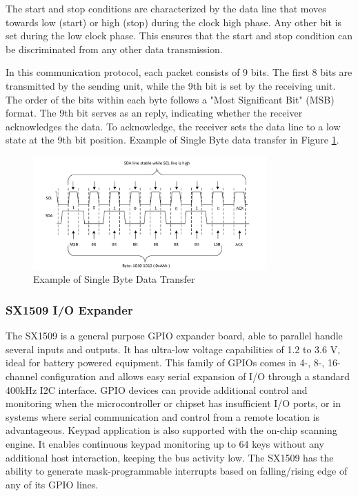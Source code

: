\documentclass[english]{article}
\begin{document}
The start and stop conditions are characterized by the data line that
moves towards low (start) or high (stop) during the clock high phase.
Any other bit is set during the low clock phase. This ensures that the
start and stop condition can be discriminated from any other data
transmission.\newline

In this communication protocol, each packet consists of 9 bits. 
The first 8 bits are transmitted by the sending unit, while the 9th bit is set by the receiving unit. 
The order of the bits within each byte follows a "Most Significant Bit" (MSB) format. 
The 9th bit serves as an reply, indicating whether the receiver acknowledges the data. 
To acknowledge, the receiver sets the data line to a low state at the 9th bit position.
Example of Single Byte data transfer in Figure \ref{fig:Data}.
\begin{figure}[!h]
	\centering
	\includegraphics[width=0.80\textwidth,]{figures/Single_byte.png}
	\caption{Example of Single Byte Data Transfer}
	\label{fig:Data}
\end{figure}

\subsubsection{SX1509 I/O Expander}
The SX1509 is a general purpose GPIO expander board, able to parallel handle several inputs and outputs. It has ultra-low voltage capabilities of 1.2 to 3.6 V, ideal for battery powered equipment. This family of
GPIOs comes in 4-, 8-, 16-channel configuration and
allows easy serial expansion of I/O through a
standard 400kHz I2C interface. GPIO devices can
provide additional control and monitoring when the
microcontroller or chipset has insufficient I/O ports, or
in systems where serial communication and control
from a remote location is advantageous. Keypad application is also supported with
the on-chip scanning engine. It enables
continuous keypad monitoring up to 64 keys without
any additional host interaction, keeping the bus activity low. The SX1509 has the ability to generate mask-programmable interrupts based on
falling/rising edge of any of its GPIO lines. \newline
\end{document}

